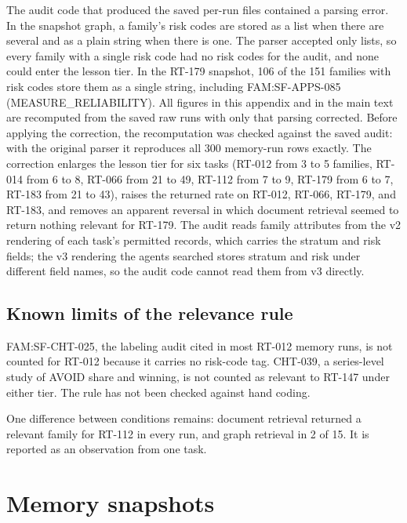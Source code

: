 \documentclass[11pt]{article}
\begin{document}
The audit code that produced the saved per-run files contained a parsing error. In the snapshot graph, a family's risk codes are stored as a list when there are several and as a plain string when there is one. The parser accepted only lists, so every family with a single risk code had no risk codes for the audit, and none could enter the lesson tier. In the RT-179 snapshot, 106 of the 151 families with risk codes store them as a single string, including FAM:SF-APPS-085 (MEASURE\_RELIABILITY). All figures in this appendix and in the main text are recomputed from the saved raw runs with only that parsing corrected. Before applying the correction, the recomputation was checked against the saved audit: with the original parser it reproduces all 300 memory-run rows exactly. The correction enlarges the lesson tier for six tasks (RT-012 from 3 to 5 families, RT-014 from 6 to 8, RT-066 from 21 to 49, RT-112 from 7 to 9, RT-179 from 6 to 7, RT-183 from 21 to 43), raises the returned rate on RT-012, RT-066, RT-179, and RT-183, and removes an apparent reversal in which document retrieval seemed to return nothing relevant for RT-179. The audit reads family attributes from the v2 rendering of each task's permitted records, which carries the stratum and risk fields; the v3 rendering the agents searched stores stratum and risk under different field names, so the audit code cannot read them from v3 directly.

\subsection*{Known limits of the relevance rule}

FAM:SF-CHT-025, the labeling audit cited in most RT-012 memory runs, is not counted for RT-012 because it carries no risk-code tag. CHT-039, a series-level study of AVOID share and winning, is not counted as relevant to RT-147 under either tier. The rule has not been checked against hand coding.

One difference between conditions remains: document retrieval returned a relevant family for RT-112 in every run, and graph retrieval in 2 of 15. It is reported as an observation from one task.

\section{Memory snapshots}
\label{app:snapshots}
\end{document}
